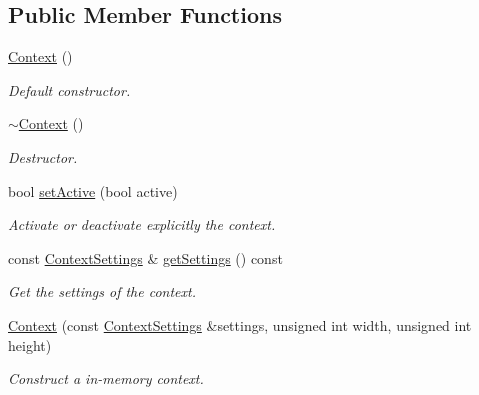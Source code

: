 \subsection*{Public Member Functions}
\begin{DoxyCompactItemize}
\item 
\mbox{\hyperlink{classsf_1_1_context_aba22797a790706ca2c5c04ee39f2b555}{Context}} ()
\begin{DoxyCompactList}\small\item\em Default constructor. \end{DoxyCompactList}\item 
\mbox{\hyperlink{classsf_1_1_context_a805b1bbdb3e52b1fda7c9bf2cd6ca86b}{$\sim$\+Context}} ()
\begin{DoxyCompactList}\small\item\em Destructor. \end{DoxyCompactList}\item 
bool \mbox{\hyperlink{classsf_1_1_context_a0806f915ea81ae1f4e8135a7a3696562}{set\+Active}} (bool active)
\begin{DoxyCompactList}\small\item\em Activate or deactivate explicitly the context. \end{DoxyCompactList}\item 
const \mbox{\hyperlink{structsf_1_1_context_settings}{Context\+Settings}} \& \mbox{\hyperlink{classsf_1_1_context_a2cc81c5466553d1901f660d866b4b48b}{get\+Settings}} () const
\begin{DoxyCompactList}\small\item\em Get the settings of the context. \end{DoxyCompactList}\item 
\mbox{\hyperlink{classsf_1_1_context_a2a9e3529e48919120e6b6fc10bad296c}{Context}} (const \mbox{\hyperlink{structsf_1_1_context_settings}{Context\+Settings}} \&settings, unsigned int width, unsigned int height)
\begin{DoxyCompactList}\small\item\em Construct a in-\/memory context. \end{DoxyCompactList}\end{DoxyCompactItemize}
